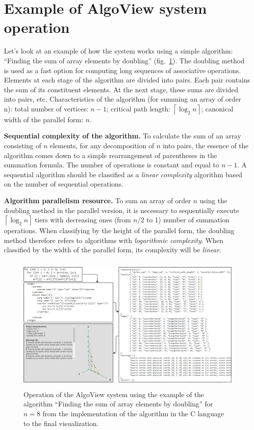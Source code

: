 \section{Example of AlgoView system operation}

Let's look at an example of how the system works using a simple algorithm: ``Finding the sum of array elements by doubling'' (fig.~\ref{fig2}). The doubling method is used as a fast option for computing long sequences of associative operations. Elements at each stage of the algorithm are divided into pairs. Each pair contains the sum of its constituent elements. At the next stage, these sums are divided into pairs, etc. Characteristics of the algorithm (for summing an array of order n): total number of vertices: $n-1$; critical path length: $\left\lceil{\log_2n}\right\rceil$; canonical width of the parallel form: $n$.

\textbf{Sequential complexity of the algorithm.} To calculate the sum of an array consisting of $n$ elements, for any decomposition of $n$ into pairs, the essence of the algorithm comes down to a simple rearrangement of parentheses in the summation formula. The number of operations is constant and equal to $n-1$. A sequential algorithm should be classified as a \textit{linear complexity} algorithm based on the number of sequential operations.

\textbf{Algorithm parallelism resource.} To sum an array of order $n$ using the doubling method in the parallel version, it is necessary to sequentially execute $\left\lceil{\log_2n}\right\rceil$ tiers with decreasing ones (from $n/2$ to 1) number of summation operations. When classifying by the height of the parallel form, the doubling method therefore refers to algorithms with \textit{logarithmic complexity}. When classified by the width of the parallel form, its complexity will be \textit{linear}.


\begin{figure}
\centering
\includegraphics[height=6.78cm]{assets/algo_example.png}
\caption{Operation of the AlgoView system using the example of the algorithm ``Finding the sum of array elements by doubling'' for $n = 8$ from the implementation of the algorithm in the C language to the final visualization.}
\label{fig2}
\end{figure}